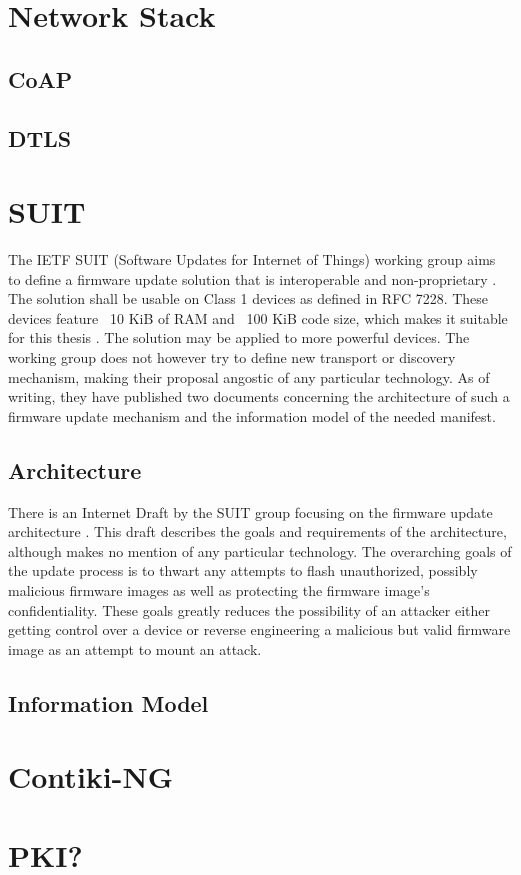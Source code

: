\documentclass[0-thesis.tex]{subfiles}
\begin{document}
\section{Network Stack}
\subsection{CoAP}

\subsection{DTLS}

\section{SUIT}
The IETF SUIT (Software Updates for Internet of Things) working group aims to define a firmware 
update solution that is interoperable and non-proprietary \parencite{suit}. The solution shall 
be usable on Class 1 devices as defined in RFC 7228. These devices feature ~10 KiB of RAM and 
~100 KiB code size, which makes it suitable for this thesis \parencite{rfc7228}. The solution 
may be applied to more powerful devices. The working group does not however try to define 
new transport or discovery mechanism, making their proposal angostic of any particular 
technology. As of writing, they have published two documents concerning the architecture of 
such a firmware update mechanism and the information model of the needed manifest.

\subsection{Architecture}
There is an Internet Draft by the SUIT group focusing on the firmware update architecture 
\parencite{suit-architecture}. This draft describes the goals and requirements of the 
architecture, although makes no mention of any particular technology. The overarching goals 
of the update process is to thwart any attempts to flash unauthorized, possibly malicious 
firmware images as well as protecting the firmware image's confidentiality. These goals 
greatly reduces the possibility of an attacker either getting control over a device or 
reverse engineering a malicious but valid firmware image as an attempt to mount an attack.



\subsection{Information Model}

\section{Contiki-NG}

\section{PKI?}
\end{document}
